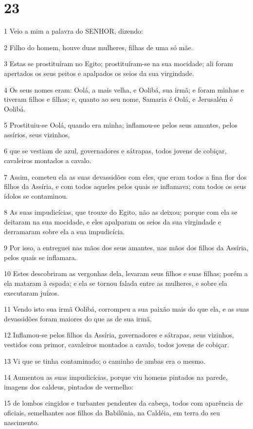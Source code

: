 \chapter{23}

\par 1 Veio a mim a palavra do SENHOR, dizendo:
\par 2 Filho do homem, houve duas mulheres, filhas de uma só mãe.
\par 3 Estas se prostituíram no Egito; prostituíram-se na sua mocidade; ali foram apertados os seus peitos e apalpados os seios da sua virgindade.
\par 4 Os seus nomes eram: Oolá, a mais velha, e Oolibá, sua irmã; e foram minhas e tiveram filhos e filhas; e, quanto ao seu nome, Samaria é Oolá, e Jerusalém é Oolibá.
\par 5 Prostituiu-se Oolá, quando era minha; inflamou-se pelos seus amantes, pelos assírios, seus vizinhos,
\par 6 que se vestiam de azul, governadores e sátrapas, todos jovens de cobiçar, cavaleiros montados a cavalo.
\par 7 Assim, cometeu ela as suas devassidões com eles, que eram todos a fina flor dos filhos da Assíria, e com todos aqueles pelos quais se inflamava; com todos os seus ídolos se contaminou.
\par 8 As suas impudicícias, que trouxe do Egito, não as deixou; porque com ela se deitaram na sua mocidade, e eles apalparam os seios da sua virgindade e derramaram sobre ela a sua impudicícia.
\par 9 Por isso, a entreguei nas mãos dos seus amantes, nas mãos dos filhos da Assíria, pelos quais se inflamara.
\par 10 Estes descobriram as vergonhas dela, levaram seus filhos e suas filhas; porém a ela mataram à espada; e ela se tornou falada entre as mulheres, e sobre ela executaram juízos.
\par 11 Vendo isto sua irmã Oolibá, corrompeu a sua paixão mais do que ela, e as suas devassidões foram maiores do que as de sua irmã.
\par 12 Inflamou-se pelos filhos da Assíria, governadores e sátrapas, seus vizinhos, vestidos com primor, cavaleiros montados a cavalo, todos jovens de cobiçar.
\par 13 Vi que se tinha contaminado; o caminho de ambas era o mesmo.
\par 14 Aumentou as suas impudicícias, porque viu homens pintados na parede, imagens dos caldeus, pintados de vermelho:
\par 15 de lombos cingidos e turbantes pendentes da cabeça, todos com aparência de oficiais, semelhantes aos filhos da Babilônia, na Caldéia, em terra do seu nascimento.
